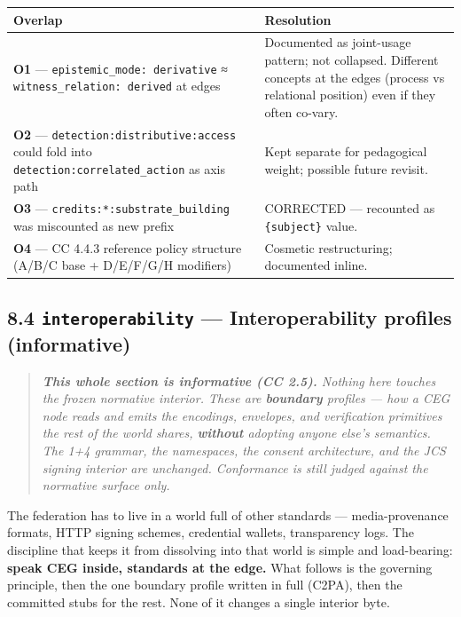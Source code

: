 \documentclass[11pt]{article}
\begin{document}
{\footnotesize
\begin{longtable}{|p{8.0cm}|p{8.0cm}|}\hline
\textbf{Overlap} & \textbf{Resolution} \\ \hline\endhead
\textbf{O1} — \texttt{epistemic\_mode: derivative} ≈ \texttt{witness\_relation: derived} at edges & Documented as joint-usage pattern; not collapsed. Different concepts at the edges (process vs relational position) even if they often co-vary. \\ \hline
\textbf{O2} — \texttt{detection:distributive:access} could fold into \texttt{detection:correlated\_action} as axis path & Kept separate for pedagogical weight; possible future revisit. \\ \hline
\textbf{O3} — \texttt{credits:*:substrate\_building} was miscounted as new prefix & CORRECTED — recounted as \texttt{\{subject\}} value. \\ \hline
\textbf{O4} — CC 4.4.3 reference policy structure (A/B/C base + D/E/F/G/H modifiers) & Cosmetic restructuring; documented inline. \\ \hline
\end{longtable}}


\subsection*{8.4 \texttt{interoperability} — Interoperability profiles (informative)}


\begin{quote}\itshape \textbf{This whole section is informative (CC 2.5).} Nothing here touches the frozen normative interior. These are \textbf{boundary} profiles — how a CEG node reads and emits the encodings, envelopes, and verification primitives the rest of the world shares, \textbf{without} adopting anyone else's \textit{semantics}. The 1+4 grammar, the namespaces, the consent architecture, and the JCS signing interior are unchanged. Conformance is still judged against the normative surface only.\end{quote}


The federation has to live in a world full of other standards — media-provenance formats, HTTP signing schemes, credential wallets, transparency logs. The discipline that keeps it from dissolving into that world is simple and load-bearing: \textbf{speak CEG inside, standards at the edge.} What follows is the governing principle, then the one boundary profile written in full (C2PA), then the committed stubs for the rest. None of it changes a single interior byte.
\end{document}
